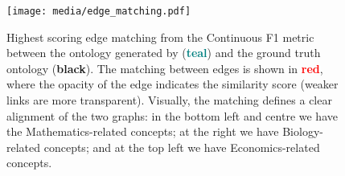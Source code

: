 \begin{landscape}
    \centering
    \begin{figure}[t]
        \vspace*{-1.2cm}
        \centering
        \texttt{[image: media/edge\_matching.pdf]}
        \caption{Highest scoring edge matching from the Continuous F1 metric between the ontology generated by \name (\textcolor{teal}{\textbf{teal}}) and the ground truth ontology (\textbf{black}). The matching between edges is shown in \textcolor{red}{\textbf{red}}, where the opacity of the edge indicates the similarity score (weaker links are more transparent). Visually, the matching defines a clear alignment of the two graphs: in the bottom left and centre we have the Mathematics-related concepts; at the right we have Biology-related concepts; and at the top left we have Economics-related concepts.}
        \label{fig:edge-matching}
    \end{figure}
\end{landscape}